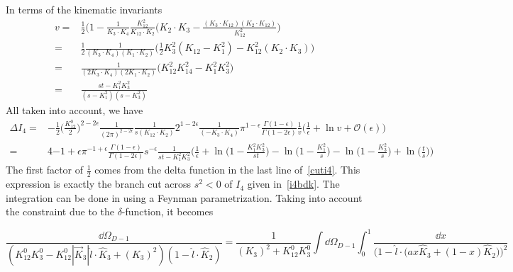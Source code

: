 In terms of the kinematic invariants
\begin{equation*}
\begin{split}
v= &
\frac{1}{2}\Big( 1 - \frac{1}{K_3\cdot K_4}\frac{K_{12}^2}{K_{12}\cdot K_2}\big(K_2\cdot K_3 - \frac{(K_3\cdot K_{12})(K_2\cdot K_{12})}{K_{12}^2} \Big)
\\
= &
\frac{1}{2}\frac{1}{(K_3\cdot K_4)(K_1\cdot K_2)}
\Big( \frac{1}{2}K_3^2 (K_{12}- K_1^2) - K_{12}^2(K_2\cdot K_3)
\Big)
\\
=&
\frac{1}{(2K_3\cdot K_4)(2K_1\cdot K_2)}\big(K_{12}^2K_{14}^2 - K_1^2K_3^2\big)
\\
= &
\frac{st - K_1^2K_3^2}{(s-K_1^2)(s-K_3^2)}
\end{split}
\end{equation*}
%
All taken into account, we have
\begin{equation*}
\begin{split}
\Delta I_4 = & -\frac{1}{2}\big(\frac{K_{12}^0}{2}\big)^{2-2\epsilon}\frac{1}{(2\pi)^{2-2\epsilon}}\frac{1}{s (K_{12}\cdot K_2)}2^{1-2\epsilon}\frac{1}{(-K_3\cdot K_4)}\pi^{1-\epsilon} \frac{\Gamma(1-\epsilon)}{\Gamma(1-2\epsilon)}
\frac{1}{v}\Big(\frac{1}{\epsilon} + \ln v + \mathcal{O}(\epsilon)\Big)
\\
= & 4{-1+\epsilon}\pi^{-1+\epsilon}\frac{\Gamma(1-\epsilon)}{\Gamma(1-2\epsilon)}s^{-\epsilon}\frac{1}{st - K_1^2K_3^2}\Big(
\frac{1}{\epsilon} + \ln\big(1-\frac{K_1^2K_3^2}{st}\big)
-\ln\big(1-\frac{K_1^2}{s}\big) - \ln\big(1-\frac{K_3^2}{s}\big) + \ln\big(\frac{t}{s}\big)\Big)
\end{split}
\end{equation*}
The first factor of $\frac{1}{2}$ comes from the delta function in the last line of~\cref{cuti4}.
This expression is exactly the branch cut across $s^2 < 0 $ of $I_4$ given in~\cref{i4bdk}. 
%
%
\iffalse %
\color{gray}
The integration can be done in using a Feynman parametrization.
Taking into account the constraint due to the $\delta$-function, 
it becomes

\begin{equation*}
\frac{\dd \Omega_{D-1}}{(K_{12}^0 K_3^0 - K_{12}^0 |\vec{K}_3| \hat{l}\cdot \hat{K}_3 + (K_3)^2)(1-\hat{l}\cdot\hat{K}_2)}
= \frac{1}{(K_3)^2 + K_{12}^0 K_3^0}\int \dd \Omega_{D-1}\int_0^1\frac{\dd x}{\Big(1-\hat{l}\cdot\big(ax \hat{K}_3 + (1-x)\hat{K}_2\big)\Big)^2}
\end{equation*}

